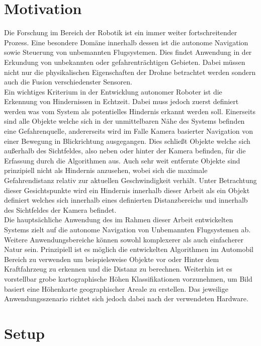 \section{Motivation}
\label{sec:motivation}
Die Forschung im Bereich der Robotik ist ein immer weiter fortschreitender Prozess. Eine besondere Domäne innerhalb dessen ist die autonome Navigation sowie Steuerung von unbemannten Flugsystemen. Dies findet Anwendung in der Erkundung von unbekannten oder gefahrenträchtigen Gebieten. Dabei müssen nicht nur die physikalischen Eigenschaften der Drohne betrachtet werden sondern auch die Fusion verschiedenster Sensoren.\\

\noindent
Ein wichtiges Kriterium in der Entwicklung autonomer Roboter ist die Erkennung von Hindernissen in Echtzeit. Dabei muss jedoch zuerst definiert werden was vom System als potentielles Hindernis erkannt werden soll. Einerseits sind alle Objekte welche sich in der unmittelbaren Nähe des Systems befinden eine Gefahrenquelle, andererseits wird im Falle Kamera basierter Navigation von einer Bewegung in Blickrichtung ausgegangen. Dies schließt Objekte welche sich außerhalb des Sichtfeldes, also neben oder hinter der Kamera befinden, für die Erfassung durch die Algorithmen aus. Auch sehr weit entfernte Objekte sind prinzipiell nicht als Hindernis anzusehen, wobei sich die maximale Gefahrendistanz relativ zur aktuellen Geschwindigkeit verhält. Unter Betrachtung dieser Gesichtspunkte wird ein Hindernis innerhalb dieser Arbeit als ein Objekt definiert welches sich innerhalb eines definierten Distanzbereichs und innerhalb des Sichtfeldes der Kamera befindet.\\

\noindent
Die hauptsächliche Anwendung des im Rahmen dieser Arbeit entwickelten Systems zielt auf die autonome Navigation von Unbemannten Flugsystemen ab. Weitere Anwendungsbereiche können sowohl komplexerer als auch einfacherer Natur sein. Prinzipiell ist es möglich die entwickelten Algorithmen im Automobil Bereich zu verwenden um beispielsweise Objekte vor oder Hinter dem Kraftfahrzeug zu erkennen und die Distanz zu berechnen. Weiterhin ist es vorstellbar grobe kartographische Höhen Klassifikationen vorzunehmen, um Bild basiert eine Höhenkarte geographischer Areale zu erstellen. Das jeweilige Anwendungsszenario richtet sich jedoch dabei nach der verwendeten Hardware. 

\section{Setup}
\label{sec:setup}

